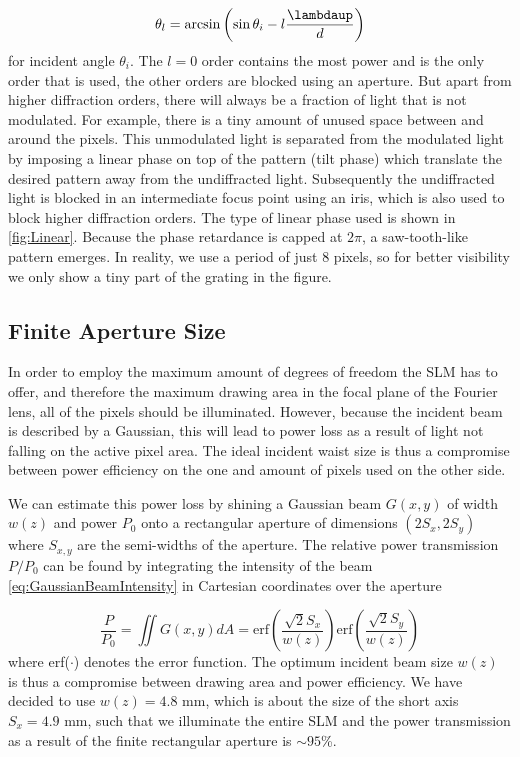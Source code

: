 \begin{equation}
    \theta_l = \arcsin\left(\sin\theta_i - l\frac{ \lambdaup}{d}\right)
\end{equation}
for incident angle $\theta_i$. 
The $l=0$ order contains the most power and is the only order that is used, the other orders are blocked using an aperture. 
But apart from higher diffraction orders, there will always be a fraction of light that is not modulated. 
For example, there is a tiny amount of unused space between and around the pixels.
This unmodulated light is separated from the modulated light by imposing a linear phase on top of the pattern (tilt phase) which translate the desired pattern away from the undiffracted light.
Subsequently the undiffracted light is blocked in an intermediate focus point using an iris, which is also used to block higher diffraction orders.
The type of linear phase used is shown in \cref{fig:Linear}.
Because the phase retardance is capped at $2\pi$, a saw-tooth-like pattern emerges.
In reality, we use a period of just 8 pixels, so for better visibility we only show a tiny part of the grating in the figure.

\subsection{Finite Aperture Size}\label{subsec:ApertureSize}

In order to employ the maximum amount of degrees of freedom the SLM has to offer, and therefore the maximum drawing area in the focal plane of the Fourier lens, all of the pixels should be illuminated. 
However, because the incident beam is described by a Gaussian, this will lead to power loss as a result of light not falling on the active pixel area. 
The ideal incident waist size is thus a compromise between power efficiency on the one and amount of pixels used on the other side.
    
We can estimate this power loss by shining a Gaussian beam $G(x,y)$ of width $w(z)$ and power $P_0$ onto a rectangular aperture of dimensions $(2S_x, 2S_y)$ where $S_{x,y}$ are the semi-widths of the aperture. 
The relative power transmission $P/P_0$ can be found by integrating the intensity of the beam \cref{eq:GaussianBeamIntensity} in Cartesian coordinates over the aperture

\begin{equation}\label{eq:RectAperturePower}
    \frac{P}{P_0} =
    \iint G(x,y) dA=
    \text{erf}\left(\frac{\sqrt{2}S_x}{w(z)}\right) \text{erf}\left(\frac{\sqrt{2}S_y}{w(z)}\right)
\end{equation}
where erf($\cdot$) denotes the error function. 
The optimum incident beam size $w(z)$ is thus a compromise between drawing area and power efficiency. 
We have decided to use $w(z) = 4.8$ mm, which is about the size of the short axis $S_x = 4.9$ mm, such that we illuminate the entire \ac{SLM} and the power transmission as a result of the finite rectangular aperture is $\sim 95$\%.

